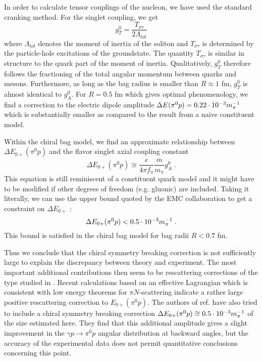 In order to calculate tensor couplings of the nucleon, we have used the
standard cranking method. For the singlet coupling, we get  
\begin{equation}
\label{G0C}
g_T^{0}=\frac{T_{\sigma\tau}}{2\Lambda_{tot}}
\end{equation}
where $\Lambda_{tot}$ denotes the moment of inertia of the soliton and
$T_{\sigma\tau}$ is determined by the particle-hole excitations of the
groundstate. The quantity $T_{\sigma\tau}$ is similar in structure to the quark
part of the moment of inertia. Qualitatively, $g_T^0$ therefore follows the 
fractioning of the total angular momentum between quarks and mesons. 
Furthermore, as long as the bag radius is smaller than $R \approx 1$ fm,
$g_T^0$ is almost identical to $g_A^0$. For $R=0.5$ fm which gives
optimal phenomenology, we find a correction to the electric dipole 
amplitude $\Delta E(\pi^0 p) = 0.22 \cdot 10^{-3}m_\pi^{-1}$ which is substantially smaller
as compared to the result from a naive constituent model. 

Within the chiral bag model, we find an approximate relationship between
$\Delta E_{0+}(\pi^0 p)$ and the flavor singlet axial coupling constant
\begin{equation}
 \Delta E_{0+}(\pi^0 p) \cong \frac{e}{4\pi f_\pi} \frac{\overline{m}}{m_\pi}
  g_A^0 \; .
\end{equation}
This equation is still reminiscent of a constituent quark model and it
might have to be modified if other degrees of freedom (e.g. gluonic) are
included. Taking it literally, we can use the upper bound quoted by the
EMC collaboration to get a constraint on $\Delta E_{0+}$ :
\begin{equation}
  \Delta E_{0+}(\pi^0 p) < 0.5 \cdot 10^{-3}m_\pi^{-1} \; .
\end{equation}    
This bound is satisfied in the chiral bag model for bag radii $R<0.7$ fm.     

Thus we conclude that the chiral symmetry breaking correction
is not sufficiently large to explain the discrepancy between theory and 
experiment.  The most important additional contributions then seem
to be rescattering corrections of the type studied in \cite{NLB,LP}.  
Recent calculations \cite{LP} based on an effective Lagrangian which
is consistent with low energy theorems for $\pi N$-scattering indicate 
a rather large positive rescattering correction to $E_{0+}(\pi^0 p)$.
The authors of ref. \cite{LP} have also tried to include a chiral
symmetry breaking correction $\Delta E_{0+}(\pi^0 p) \cong 0.5 \cdot 10^{-3}m_\pi^{-1}$
of the size estimated here. They find that this additional amplitude 
gives a slight improvement in the $\gamma p \to \pi^0 p$ angular 
distribution at backward angles, but   the  accuracy of the 
experimental data  does not permit quantitative conclusions concerning
this point.
  
